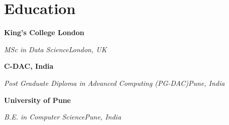 \documentclass[10pt,a4paper]{article}
\newcommand{\entry}[4]{%
  {\color{company}\bfseries #1}\hfill {\color{muted}#2}\par
  \vspace{1pt}
  {\itshape #3}\hfill {\color{muted}\itshape #4}\par
  \vspace{3pt}%
}
\begin{document}
\section{Education}
\entry{King's College London}{}{MSc in Data Science}{London, UK}
\vspace{-3pt}
\entry{C-DAC, India}{}{Post Graduate Diploma in Advanced Computing (PG-DAC)}{Pune, India}
\vspace{-3pt}
\entry{University of Pune}{}{B.E. in Computer Science}{Pune, India}
\end{document}
